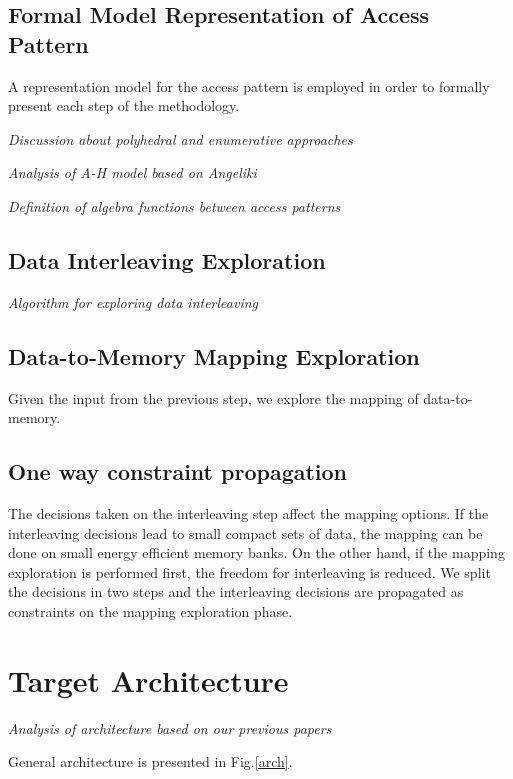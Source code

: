 \documentclass[runningheads,a4paper]{llncs}
\begin{document}
\subsection{Formal Model Representation of Access Pattern }

A representation model for the access pattern is employed in order to formally present each step of the methodology.

\textit{Discussion about polyhedral and enumerative approaches}

\textit{Analysis of A-H model based on Angeliki}

\textit{Definition of algebra functions between access patterns}

\subsection{Data Interleaving Exploration}

\textit{Algorithm for exploring data interleaving}

\subsection{Data-to-Memory Mapping Exploration}

Given the input from the previous step, we explore the mapping of data-to-memory.

\subsection{One way constraint propagation}

The decisions taken on the interleaving step affect the mapping options.
If the interleaving decisions lead to small compact sets of data, the mapping can be done on small energy efficient memory banks.
On the other hand, if the mapping exploration is performed first, the freedom for interleaving is reduced.
We split the decisions in two steps and the interleaving decisions are propagated as constraints on the mapping exploration phase. 

\section{Target Architecture}

\textit{Analysis of architecture based on our previous papers}

General architecture is presented in Fig.\ref{arch}.
\end{document}
